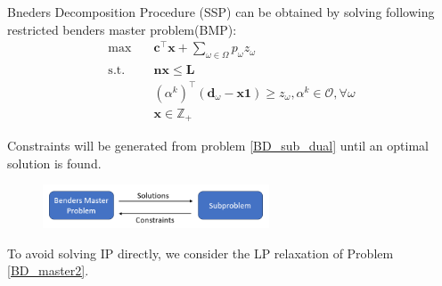 \begin{frame}{Bneders Decomposition Procedure}
  \small
  (SSP) can be obtained by solving following restricted benders master problem(BMP):
  \begin{equation}\label{BD_master2}
    \begin{aligned}
      \max \quad & \mathbf{c}^{\intercal} \mathbf{x} + \sum_{\omega \in \Omega} p_{\omega} z_{\omega} \\
      \text {s.t.} \quad & \mathbf{n} \mathbf{x} \leq \mathbf{L} \\
      & (\alpha^{k})^{\intercal}(\mathbf{d}_{\omega}- \mathbf{x} \mathbf{1}) \geq z_{\omega}, \alpha^k \in \mathcal{O}, \forall \omega \\
       & \mathbf{x} \in \mathbb{Z}_{+}
    \end{aligned}
  \end{equation} 

  Constraints will be generated from problem \eqref{BD_sub_dual} until an optimal solution is found.

  \begin{figure}[ht]
    \centering
    \includegraphics[width = 0.6\textwidth]{./images/BD.png}
  \end{figure}

  To avoid solving IP directly, we consider the LP relaxation of Problem \eqref{BD_master2}.
\end{frame}


